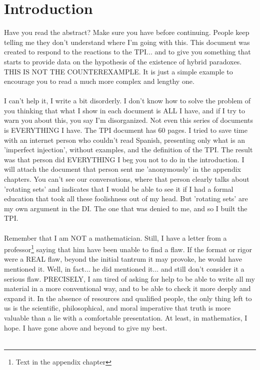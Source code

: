 \chapter{Introduction}

	\noindent
	Have you read the abstract? Make sure you have before continuing. People keep telling me they don't understand where I'm going with this. This document was created to respond to the reactions to the TPI... and to give you something that starts to provide data on the hypothesis of the existence of hybrid paradoxes. THIS IS NOT THE COUNTEREXAMPLE. It is just a simple example to encourage you to read a much more complex and lengthy one.\\\\
	
	\noindent
	I can't help it, I write a bit disorderly. I don't know how to solve the problem of you thinking that what I show in each document is ALL I have, and if I try to warn you about this, you say I'm disorganized. Not even this series of documents is EVERYTHING I have. The TPI document has 60 pages. I tried to save time with an internet person who couldn't read Spanish, presenting only what is an 'imperfect injection', without examples, and the definition of the TPI. The result was that person did EVERYTHING I beg you not to do in the introduction. I will attach the document that person sent me 'anonymously' in the appendix chapters. You can't see our conversations, where that person clearly talks about 'rotating sets' and indicates that I would be able to see it if I had a formal education that took all these foolishness out of my head. But 'rotating sets' are my own argument in the DI. The one that was denied to me, and so I built the TPI.\\\\
	
	\noindent
	Remember that I am NOT a mathematician. Still, I have a letter from a professor\footnote{Text in the appendix chapter} saying that him have been unable to find a flaw. If the format or rigor were a REAL flaw, beyond the initial tantrum it may provoke, he would have mentioned it. Well, in fact... he did mentioned it... and still don't consider it a serious flaw. PRECISELY, I am tired of asking for help to be able to write all my material in a more conventional way, and to be able to check it more deeply and expand it. In the absence of resources and qualified people, the only thing left to us is the scientific, philosophical, and moral imperative that truth is more valuable than a lie with a comfortable presentation. At least, in mathematics, I hope. I have gone above and beyond to give my best.\\\\
	
